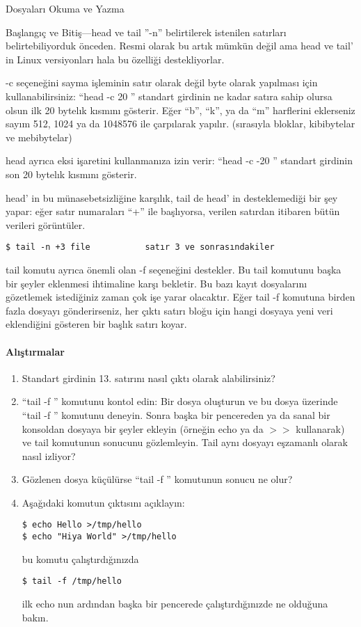 \begin{section}{Dosyaları Okuma ve Yazma}
\begin{subsection}{Başlangıç ve Bitiş—head ve tail}
”-n” belirtilerek istenilen satırları belirtebiliyorduk önceden. Resmi olarak bu artık mümkün değil ama head ve tail' in Linux versiyonları hala bu özelliği destekliyorlar.

-c seçeneğini sayma işleminin satır olarak değil byte olarak yapılması için kullanabilirsiniz: 
“head -c 20 ” standart girdinin ne kadar satıra sahip olursa olsun ilk 20 bytelık kısmını gösterir. Eğer “b”, “k”, ya da “m” harflerini eklerseniz sayım 512, 1024 ya da 1048576 ile çarpılarak yapılır. (sırasıyla bloklar, kibibytelar ve mebibytelar)

head ayrıca eksi işaretini kullanmanıza izin verir: “head -c -20 ” standart girdinin son 20 bytelık kısmını gösterir.

head' in bu münasebetsizliğine karşılık, tail de head' in desteklemediği bir şey yapar: eğer satır numaraları “+” ile başlıyorsa, verilen satırdan itibaren bütün verileri görüntüler.
\begin{verbatim}
$ tail -n +3 file           satır 3 ve sonrasındakiler
\end{verbatim}

tail komutu ayrıca önemli olan -f seçeneğini destekler. Bu tail komutunu başka bir şeyler eklenmesi ihtimaline karşı bekletir. Bu bazı kayıt dosyalarını gözetlemek istediğiniz zaman çok işe yarar olacaktır. Eğer tail -f komutuna birden fazla dosyayı gönderirseniz, her çıktı satırı bloğu için hangi dosyaya yeni veri eklendiğini gösteren bir başlık satırı koyar.

\paragraph{{\Huge{\PencilLeftDown}}Alıştırmalar}{
\begin{enumerate}
 \item Standart girdinin 13. satırını nasıl çıktı olarak alabilirsiniz?
 \item “tail -f ” komutunu kontol edin: Bir dosya oluşturun ve bu dosya üzerinde “tail -f ” komutunu deneyin. Sonra başka bir pencereden ya da sanal bir konsoldan dosyaya bir şeyler ekleyin (örneğin echo ya da $>>$ kullanarak) ve tail komutunun sonucunu gözlemleyin. Tail aynı dosyayı eşzamanlı olarak nasıl izliyor? 
\item Gözlenen dosya küçülürse “tail -f ” komutunun sonucu ne olur? 
\item Aşağıdaki komutun çıktısını açıklayın:
\begin{verbatim}
$ echo Hello >/tmp/hello 
$ echo "Hiya World" >/tmp/hello
\end{verbatim}
bu komutu çalıştırdığınızda
\begin{verbatim}
$ tail -f /tmp/hello
\end{verbatim}
ilk echo nun ardından başka bir pencerede çalıştırdığınızde ne olduğuna bakın.
\end{enumerate}}
\end{subsection}
\end{section}
